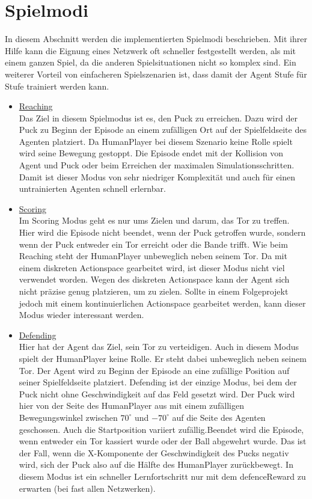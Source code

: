 \section{Spielmodi}
\label{sect:spielmodi}
In diesem Abschnitt werden die implementierten Spielmodi beschrieben. Mit ihrer Hilfe kann die Eignung eines Netzwerk oft schneller festgestellt werden, als mit einem ganzen Spiel, da die anderen Spielsituationen nicht so komplex sind. Ein weiterer Vorteil von einfacheren Spielszenarien ist, dass damit der Agent Stufe für Stufe trainiert werden kann.

\begin{itemize}
\item \underline{Reaching} \\
Das Ziel in diesem Spielmodus ist es, den Puck zu erreichen. Dazu wird der Puck zu Beginn der Episode an einem zufälligen Ort auf der Spielfeldseite des Agenten platziert. Da HumanPlayer bei diesem Szenario keine Rolle spielt wird seine Bewegung gestoppt. Die Episode endet mit der Kollision von Agent und Puck oder beim Erreichen der maximalen Simulationsschritten. Damit ist dieser Modus von sehr niedriger Komplexität und auch für einen untrainierten Agenten schnell erlernbar.

\item \underline{Scoring} \\
Im Scoring Modus geht es nur ums Zielen und darum, das Tor zu treffen. Hier wird die Episode nicht beendet, wenn der Puck getroffen wurde, sondern wenn der Puck entweder ein Tor erreicht oder die Bande trifft. Wie beim Reaching steht der HumanPlayer unbeweglich neben seinem Tor. Da mit einem diskreten Actionspace gearbeitet wird, ist dieser Modus nicht viel verwendet worden. Wegen des diskreten Actionspace kann der Agent sich nicht präzise genug platzieren, um zu zielen. Sollte in einem Folgeprojekt jedoch mit einem kontinuierlichen Actionspace gearbeitet werden, kann dieser Modus wieder interessant werden.

\item \underline{Defending} \\
Hier hat der Agent das Ziel, sein Tor zu verteidigen. Auch in diesem Modus spielt der HumanPlayer keine Rolle. Er steht dabei unbeweglich neben seinem Tor. Der Agent wird zu Beginn der Episode an eine zufällige Position auf seiner Spielfeldseite platziert. Defending ist der einzige Modus, bei dem der Puck nicht ohne Geschwindigkeit auf das Feld gesetzt wird. Der Puck wird hier von der Seite des HumanPlayer aus mit einem zufälligen Bewegungswinkel zwischen $70^\circ$ und $-70^\circ$ auf die Seite des Agenten geschossen. Auch die Startposition variiert zufällig.Beendet wird die Episode, wenn entweder ein Tor kassiert wurde oder der Ball abgewehrt wurde. Das ist der Fall, wenn die X-Komponente der Geschwindigkeit des Pucks negativ wird, sich der Puck also auf die Hälfte des HumanPlayer zurückbewegt. In diesem Modus ist ein schneller Lernfortschritt nur mit dem defenceReward zu erwarten (bei fast allen Netzwerken).


\end{itemize}
